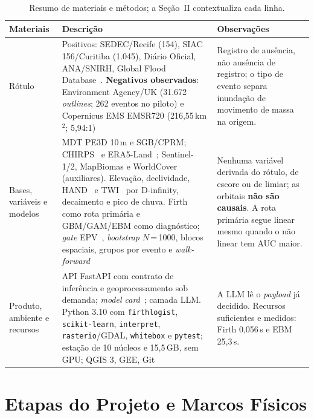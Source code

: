 \documentclass[conference]{IEEEtran}
\begin{document}
\begin{table}[!t]
\caption{Resumo de materiais e métodos; a Seção~II contextualiza cada linha.}
\label{tab:mm}
\centering
\renewcommand{\arraystretch}{0.95}
\scriptsize
\begin{tabular}{@{}>{\raggedright\arraybackslash}p{2.05cm}>{\raggedright\arraybackslash}p{7.6cm}>{\raggedright\arraybackslash}p{6.5cm}@{}}
\toprule
\textbf{Materiais} & \textbf{Descrição} & \textbf{Observações} \\
\midrule
Rótulo &
Positivos: SEDEC/Recife (154), SIAC 156/Curitiba (1.045), Diário Oficial,
ANA/SNIRH, Global Flood Database~\cite{tellman2021}. \textbf{Negativos
observados}: Environment Agency/UK (31.672 \emph{outlines}; 262 eventos no
piloto) e Copernicus EMS EMSR720 (216,55\,km$^2$; 5,94:1) &
Registro de ausência, não ausência de registro; o tipo de evento separa
inundação de movimento de massa na origem. \\

Bases, variáveis e modelos &
MDT PE3D 10\,m e SGB/CPRM; CHIRPS~\cite{funk2015} e ERA5-Land~\cite{munoz2021};
Sentinel-1/2, MapBiomas e WorldCover (auxiliares). Elevação, declividade,
HAND~\cite{renno2008} e TWI~\cite{beven1979} por D-infinity, decaimento e pico de
chuva. Firth~\cite{firth1993} como rota primária e GBM/GAM/EBM como diagnóstico;
\emph{gate} EPV~\cite{peduzzi1996}, \emph{bootstrap} $N$\,=\,1000, blocos
espaciais, grupos por evento e \emph{walk-forward} &
Nenhuma variável derivada do rótulo, de escore ou de limiar; as orbitais
\textbf{não são causais}. A rota primária segue linear mesmo quando o não linear
tem AUC maior. \\

Produto, ambiente e recursos &
API FastAPI com contrato de inferência e geoprocessamento sob demanda;
\emph{model card}~\cite{mitchell2019}; camada LLM. Python 3.10 com
\texttt{firthlogist}, \texttt{scikit-learn}, \texttt{interpret},
\texttt{rasterio}/GDAL, \texttt{whitebox} e \texttt{pytest}; estação de 10 núcleos
e 15,5\,GB, sem GPU; QGIS 3, GEE, Git &
A LLM lê o \emph{payload} já decidido. Recursos suficientes e medidos: Firth
0,056\,s e EBM 25,3\,s. \\
\bottomrule
\end{tabular}
\end{table}

\section{Etapas do Projeto e Marcos Físicos}
\label{sec:etapas}
\end{document}
